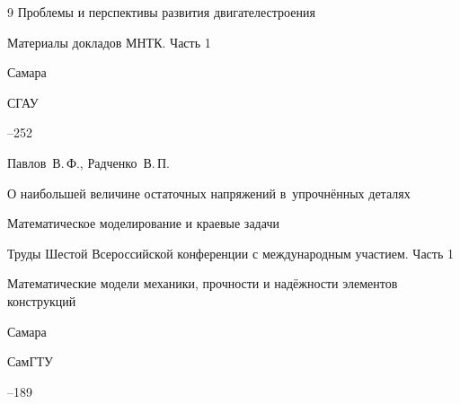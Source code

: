 \begin{thebibliography}{9}
\inbook Проблемы и перспективы развития двигателестроения

\bookinfo Материалы докладов МНТК. Часть 1

\publaddr Самара

\publ СГАУ


--252




\by Павлов~В.\,Ф., Радченко~В.\,П.

\paper О наибольшей величине остаточных напряжений в~упрочнённых деталях

\serial Математическое моделирование и краевые задачи

\inbook Труды Шестой Всероссийской конференции с международным участием. {\rm Часть 1}

\bookinfo Математические модели механики, прочности и надёжности элементов конструкций

\publaddr Самара

\publ СамГТУ


--189

\end{thebibliography}





\makeengtitle





% 

